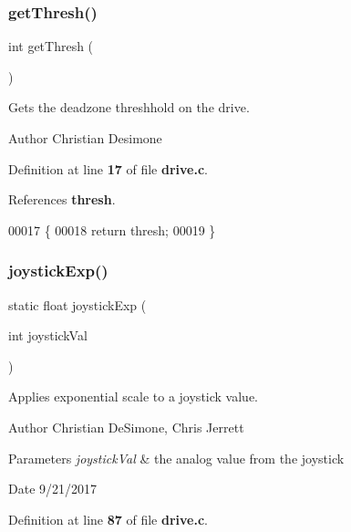 \subsubsection{get\+Thresh()}
{\footnotesize\ttfamily int get\+Thresh (\begin{DoxyParamCaption}{ }\end{DoxyParamCaption})}



Gets the deadzone threshhold on the drive. 

\begin{DoxyAuthor}{Author}
Christian Desimone 
\end{DoxyAuthor}


Definition at line \textbf{ 17} of file \textbf{ drive.\+c}.



References \textbf{ thresh}.


\begin{DoxyCode}
00017                \{
00018   \textcolor{keywordflow}{return} thresh;
00019 \}
\end{DoxyCode}
\mbox{\label{drive_8c_a6de4fbb9197f2f350c53a9f8bf23a8f1}} 
\subsubsection{joystick\+Exp()}
{\footnotesize\ttfamily static float joystick\+Exp (\begin{DoxyParamCaption}\item[{int}]{joystick\+Val }\end{DoxyParamCaption})\hspace{0.3cm}{\ttfamily [static]}}



Applies exponential scale to a joystick value. 

\begin{DoxyAuthor}{Author}
Christian De\+Simone, Chris Jerrett 
\end{DoxyAuthor}

\begin{DoxyParams}{Parameters}
{\em joystick\+Val} & the analog value from the joystick \\
\hline
\end{DoxyParams}
\begin{DoxyDate}{Date}
9/21/2017 
\end{DoxyDate}


Definition at line \textbf{ 87} of file \textbf{ drive.\+c}.



